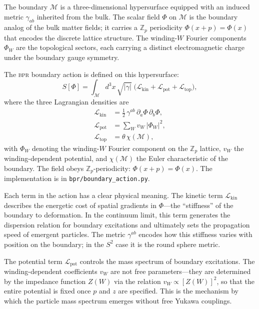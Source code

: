 \documentclass[aps,prd,twocolumn,superscriptaddress,longbibliography,nofootinbib]{revtex4-2}
\newcommand{\Zp}{\mathbb{Z}_p}
\newcommand{\Stwo}{S^2}
\newcommand{\Zimp}{Z}
\newcommand{\bpr}{\textsc{bpr}}
\begin{document}
The boundary $\mathcal{M}$ is a three-dimensional hypersurface
equipped with an induced metric $\gamma_{ab}$ inherited from the bulk.
The scalar field $\Phi$ on $\mathcal{M}$ is the boundary analog of
the bulk matter fields; it carries a $\Zp$ periodicity
$\Phi(x+p) = \Phi(x)$ that encodes the discrete lattice structure.
The winding-$W$ Fourier components $\Phi_W$ are the topological
sectors, each carrying a distinct electromagnetic charge under the
boundary gauge symmetry.

The \bpr{} boundary action is defined on this hypersurface:
\begin{equation}
S[\Phi] = \int_{\mathcal{M}} \! d^3x \, \sqrt{|\gamma|} \;
\bigl( \mathcal{L}_{\mathrm{kin}} +
       \mathcal{L}_{\mathrm{pot}} +
       \mathcal{L}_{\mathrm{top}} \bigr),
\label{eq:master_action}
\end{equation}
where the three Lagrangian densities are
\begin{align}
\mathcal{L}_{\mathrm{kin}} &=
  \tfrac{1}{2}\, \gamma^{ab}\, \partial_a \Phi\, \partial_b \Phi,
  \label{eq:Lkin} \\
\mathcal{L}_{\mathrm{pot}} &=
  \sum_{W} v_W \, |\Phi_W|^2,
  \label{eq:Lpot} \\
\mathcal{L}_{\mathrm{top}} &=
  \theta\, \chi(\mathcal{M}),
  \label{eq:Ltop}
\end{align}
with $\Phi_W$ denoting the winding-$W$ Fourier component on the
$\Zp$ lattice, $v_W$ the winding-dependent potential, and
$\chi(\mathcal{M})$ the Euler characteristic of the boundary.  The
field obeys $\Zp$-periodicity: $\Phi(x + p) = \Phi(x)$.  The
implementation is in \texttt{bpr/boundary\_action.py}.

Each term in the action has a clear physical meaning.  The kinetic
term $\mathcal{L}_{\mathrm{kin}}$ describes the energetic cost of
spatial gradients in $\Phi$---the ``stiffness'' of the boundary to
deformation.  In the continuum limit, this term generates the
dispersion relation for boundary excitations and ultimately sets the
propagation speed of emergent particles.  The metric
$\gamma^{ab}$ encodes how this stiffness varies with position on the
boundary; in the $\Stwo$ case it is the round sphere metric.

The potential term $\mathcal{L}_{\mathrm{pot}}$ controls the mass
spectrum of boundary excitations.  The winding-dependent
coefficients $v_W$ are not free parameters---they are determined
by the impedance function $\Zimp(W)$ via the relation
$v_W \propto [\Zimp(W)]^2$, so that the entire potential is fixed
once $p$ and $z$ are specified.  This is the mechanism by which the
particle mass spectrum emerges without free Yukawa couplings.
\end{document}
